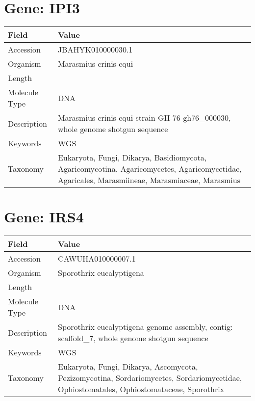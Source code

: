 \documentclass[10pt]{article}
\begin{document}
\section{Gene: IPI3}
{\footnotesize
\begin{longtable}{>{\raggedright\arraybackslash}p{4.5cm} >{\raggedright\arraybackslash}p{11.5cm}}
\textbf{Field} & \textbf{Value} \\
\hline
Accession & JBAHYK010000030.1 \\
Organism & Marasmius crinis-equi \\
Length & 120529 \\
Molecule Type & DNA \\
Description & Marasmius crinis-equi strain GH-76 gh76\_000030, whole genome shotgun sequence \\
Keywords & WGS \\
Taxonomy & Eukaryota, Fungi, Dikarya, Basidiomycota, Agaricomycotina, Agaricomycetes, Agaricomycetidae, Agaricales, Marasmiineae, Marasmiaceae, Marasmius \\
\end{longtable}
}

\vspace{1em}
\section{Gene: IRS4}
{\footnotesize
\begin{longtable}{>{\raggedright\arraybackslash}p{4.5cm} >{\raggedright\arraybackslash}p{11.5cm}}
\textbf{Field} & \textbf{Value} \\
\hline
Accession & CAWUHA010000007.1 \\
Organism & Sporothrix eucalyptigena \\
Length & 525197 \\
Molecule Type & DNA \\
Description & Sporothrix eucalyptigena genome assembly, contig: scaffold\_7, whole genome shotgun sequence \\
Keywords & WGS \\
Taxonomy & Eukaryota, Fungi, Dikarya, Ascomycota, Pezizomycotina, Sordariomycetes, Sordariomycetidae, Ophiostomatales, Ophiostomataceae, Sporothrix \\
\end{longtable}
}

\vspace{1em}
\end{document}

